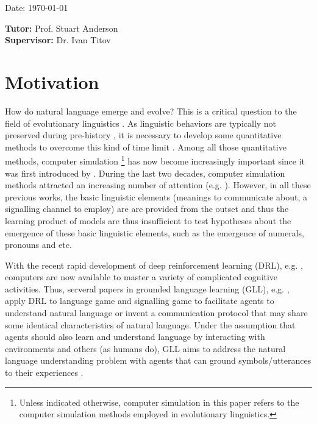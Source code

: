 \documentclass[a4paper,11pt]{article}
\newcommand{\tutor}{Prof. Stuart Anderson}
\newcommand{\supervisor}{Dr. Ivan Titov}
\begin{document}
\vspace*{3cm}
Date: \today

\vfill
{\bf Tutor:} \tutor\\
{\bf Supervisor:} \supervisor
\newpage

\setcounter{page}{1}                            %
\footruleheight{1pt}
\headruleheight{1pt}
\rhead{- \thepage}
\cfoot{}
%
\tableofcontents

\section{Motivation}
\label{sec:1intro}

How do natural language emerge and evolve? This is a critical question to the field of evolutionary linguistics \cite{macwhinney2013emergence}. As linguistic behaviors are typically not preserved during pre-history \cite{lieberman2006toward}, it is necessary to develop some quantitative methods to overcome this kind of time limit \cite{evans2009myth}. Among all those quantitative methods, computer simulation \footnote{Unless indicated otherwise, computer simulation in this paper refers to the computer simulation methods employed in evolutionary linguistics.} has now become increasingly important since it was first introduced by \cite{hurford1989biological}. During the last two decades, computer simulation methods attracted an increasing number of attention (e.g. \cite{hurford1998approaches, knight2000evolutionary, briscoe2002book, cangelosi2012simulating, christiansen2003language, bickerton2009biological}). However, in all these previous works, the basic linguistic elements (meanings to communicate about, a signalling channel to employ) are are provided from the outset and thus the learning product of models are thus insufficient to test hypotheses about the emergence of these basic linguistic elements, such as the emergence of numerals, pronouns
and etc.

With the recent rapid development of deep reinforcement learning (DRL), e.g. \cite{mnih2015human, silver2017mastering}, computers are now available to master a variety of complicated cognitive activities. Thus, serveral papers in grounded language learning (GLL), e.g.  \cite{hermann2017grounded, mordatch2018emergence}, apply DRL to language game \cite{wittgenstein2009philosophical} and signalling game \cite{lewis2008convention} to facilitate agents to understand natural language or invent a communication protocol that may share some identical characteristics of natural language. Under the assumption that agents should also learn and understand language by interacting with environments and others (as humans do), GLL aims to address the natural language understanding problem with agents that can ground symbols/utterances to their experiences \cite{hill2017understanding}.
\end{document}
